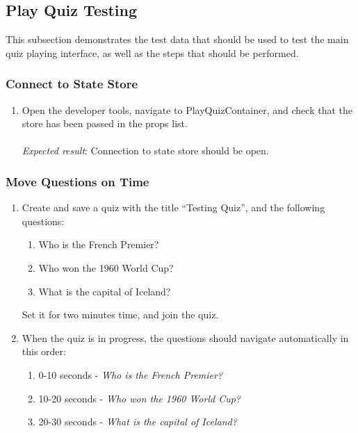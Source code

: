 \subsection{Play Quiz Testing} %
\label{sub:play_quiz_testing}
This subsection demonstrates the test data that should be used to test the main quiz playing interface, as well as the steps that should be performed.

\subsubsection{Connect to State Store} %
\label{ssub:connect_to_state_store}
\begin{enumerate}[leftmargin=*]
\item Open the developer tools, navigate to PlayQuizContainer, and check that the store has been passed in the props list.\\\\
\textit{Expected result}: Connection to state store should be open.
\end{enumerate}

\subsubsection{Move Questions on Time} %
\label{ssub:move_questions_on_time}
\begin{enumerate}[leftmargin=*]
\item Create and save a quiz with the title ``Testing Quiz'', and the following questions:
\begin{enumerate}
\item Who is the French Premier?
\item Who won the 1960 World Cup?
\item What is the capital of Iceland?
\end{enumerate}
Set it for two minutes time, and join the quiz.
\item When the quiz is in progress, the questions should navigate automatically in this order:
\begin{enumerate}
\item 0-10 seconds - \textit{Who is the French Premier?}
\item 10-20 seconds - \textit{Who won the 1960 World Cup?}
\item 20-30 seconds - \textit{What is the capital of Iceland?}
\end{enumerate}
\end{enumerate}

